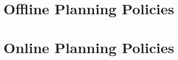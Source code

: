 \documentclass[letterpaper, 12pt, leqno]{report}
\begin{document}








\chapter{Offline Planning Policies}

\chapter{Online Planning Policies}




\end{document}
